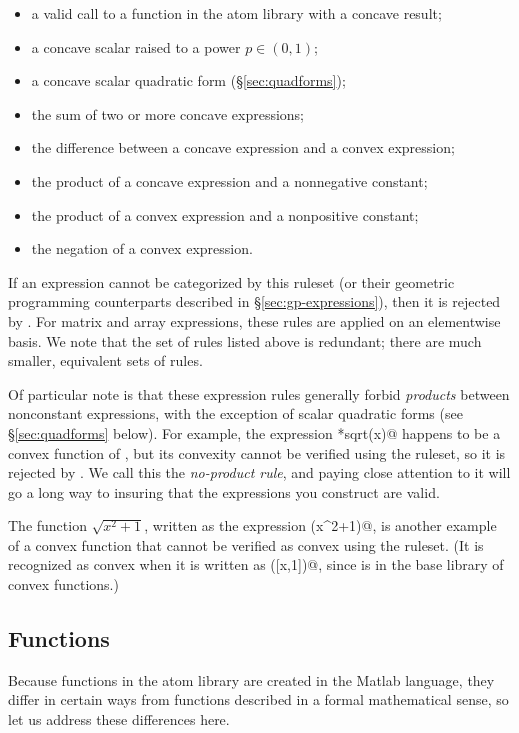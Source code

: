 \documentclass[12pt]{article}
\begin{document}
\begin{itemize}
\begin{itemize}
\item a valid call to a function in the atom library with a concave result;
\item a concave scalar raised to a power $p\in(0,1)$;
\item a concave scalar quadratic form (\S\ref{sec:quadforms});
\item the sum of two or more concave expressions;
\item the difference between a concave expression and a convex expression;
\item the product of a concave expression and a nonnegative constant; 
\item the product of a convex expression and a nonpositive constant;
\item the negation of a convex expression.
\end{itemize}
\end{itemize}
If an expression cannot be categorized by this ruleset (or their
geometric programming counterparts described 
in \S\ref{sec:gp-expressions}), then it is rejected by \cvx.
For matrix and array expressions, these rules
are applied on an elementwise basis.
We note that the set of rules listed above is redundant;
there are much smaller, equivalent sets of rules.

Of particular note is that these expression rules generally 
forbid \emph{products}
between nonconstant expressions,  
with the exception of scalar quadratic forms 
(see \S\ref{sec:quadforms} below). 
For example, the expression \verb@x*sqrt(x)@ happens to be a 
convex function of \verb@x@, but its convexity cannot be verified
using the \cvx ruleset, so it is rejected by \cvx.
We call this the \emph{no-product rule},
and paying close attention to it will go a long way to insuring that the
expressions you construct are valid.

The function $\sqrt{x^2+1}$, written as the expression 
\verb@sqrt(x^2+1)@, is another example of a convex 
function that cannot be verified 
as convex using the \cvx ruleset.
(It is recognized as convex when it is written as \verb@norm([x,1])@,
since \verb@norm@ is in the \cvx base library of convex functions.)

\subsection{Functions}
\label{sec:functions}

Because functions in the \cvx atom library are created in the 
Matlab language,
they differ in certain ways from functions described in a 
formal mathematical sense,
so let us address these differences here.  
\end{document}
